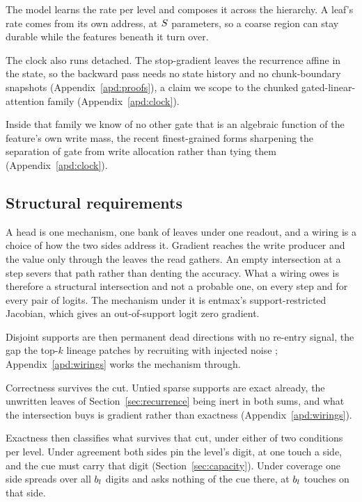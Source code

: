 The model learns the rate per level and composes it across the hierarchy. A leaf's rate comes from its own address, at $S$ parameters, so a coarse region can stay durable while the features beneath it turn over.

The clock also runs detached. The stop-gradient leaves the recurrence affine in the state, so the backward pass needs no state history and no chunk-boundary snapshots (Appendix~\ref{apd:proofs}), a claim we scope to the chunked gated-linear-attention family (Appendix~\ref{apd:clock}).

Inside that family we know of no other gate that is an algebraic function of the feature's own write mass, the recent finest-grained forms sharpening the separation of gate from write allocation rather than tying them (Appendix~\ref{apd:clock}).

\subsection{Structural requirements}
\label{sec:wiring}

A head is one mechanism, one bank of leaves under one readout, and a wiring is a choice of how the two sides address it. Gradient reaches the write producer and the value only through the leaves the read gathers. An empty intersection at a step severs that path rather than denting the accuracy. What a wiring owes is therefore a structural intersection and not a probable one, on every step and for every pair of logits. The mechanism under it is entmax's support-restricted Jacobian, which gives an out-of-support logit zero gradient.

Disjoint supports are then permanent dead directions with no re-entry signal, the gap the top-$k$ lineage patches by recruiting with injected noise \citep{shazeer2017moe}; Appendix~\ref{apd:wirings} works the mechanism through.

Correctness survives the cut. Untied sparse supports are exact already, the unwritten leaves of Section~\ref{sec:recurrence} being inert in both sums, and what the intersection buys is gradient rather than exactness (Appendix~\ref{apd:wirings}).

Exactness then classifies what survives that cut, under either of two conditions per level. Under agreement both sides pin the level's digit, at one touch a side, and the cue must carry that digit (Section~\ref{sec:capacity}). Under coverage one side spreads over all $b_l$ digits and asks nothing of the cue there, at $b_l$ touches on that side.

